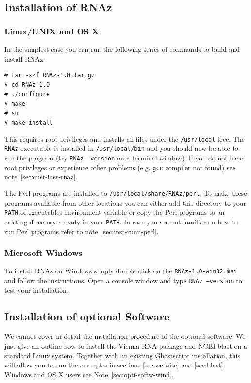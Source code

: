 \documentclass[11pt]{article}
\begin{document}
\subsection{Installation of RNAz}

\subsubsection{Linux/UNIX and OS X}

In the simplest case you can run the following series of commands to build
and install RNAz:

\begin{verbatim}
# tar -xzf RNAz-1.0.tar.gz
# cd RNAz-1.0 
# ./configure
# make
# su
# make install
\end{verbatim}

This requires root privileges and installs all files under the
\texttt{/usr/local} tree. The \texttt{RNAz} executable is installed in
\texttt{/usr/local/bin} and you should now be able to run the program (try
\texttt{RNAz --version} on a terminal window). If you do not have root
privileges or experience other problems (e.g. \texttt{gcc} compiler not
found) see note~\ref{sec:cust-inst-rnaz}.

The Perl programs are installed to \texttt{/usr/local/share/RNAz/perl}. To
make these programs available from other locations you can either add this
directory to your \texttt{PATH} of executables environment variable or copy
the Perl programs to an existing directory already in your \texttt{PATH}.
In case you are not familiar on how to run Perl programs refer to
note~\ref{sec:inst-runn-perl}.

\subsubsection{Microsoft Windows}
\label{sec:microsoft-windows}

To install RNAz on Windows simply double click on the
\texttt{RNAz-1.0-win32.msi} and follow the instructions. Open a console
window and type \texttt{RNAz --version} to test your installation.

\subsection{Installation of optional Software}
\label{sec:inst-opti-softw}

We cannot cover in detail the installation procedure of the optional
software. We just give an outline how to install the Vienna RNA package and
NCBI blast on a standard Linux system. Together with an existing
Ghostscript installation, this will allow you to run the examples in
sections \ref{sec:website} and \ref{sec:blast}. Windows and OS X users see
Note~\ref{sec:opti-softw-wind}.
\end{document}
